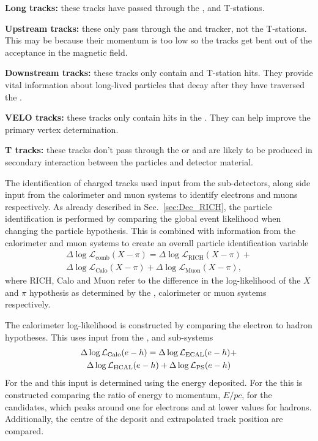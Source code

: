 \begin{description}
\item \textbf{Long tracks:} these tracks have passed through the \velo, \ttracker and T-stations.
\item \textbf{Upstream tracks:} these only pass through the \velo and \ttracker tracker, not the T-stations. This may be because their momentum is too low so the tracks get bent out of the acceptance in the magnetic field. 
\item \textbf{Downstream tracks:} these tracks only contain \ttracker and T-station hits. They provide vital information about long-lived particles that decay after they have traversed the \velo. 
\item \textbf{VELO tracks:} these tracks only contain hits in the \velo. They can help improve the primary vertex determination. 
\item \textbf{T tracks:} these tracks don't pass through the \velo or \ttracker and are likely to be produced in secondary interaction between the particles and detector material. 
\end{description}


The identification of charged tracks used input from the \rich sub-detectors, along side input from the calorimeter and muon systems to identify electrons and muons respectively. 
As already described in Sec.~\ref{sec:Dec_RICH}, the \rich particle identification is performed by comparing the global event likelihood when changing the particle hypothesis. 
This is combined with information from the calorimeter and muon systems to create an overall particle identification variable
\begin{multline}
\Delta \log{\mathcal{L}_\text{comb}}(X-\pi) =  \Delta \log{\mathcal{L}_\text{RICH}}(X-\pi) + \\
 \Delta \log{\mathcal{L}_\text{Calo}}(X-\pi) + \Delta \log{\mathcal{L}_\text{Muon}}(X-\pi),
\end{multline}
where RICH, Calo and Muon refer to the difference in the log-likelihood of the $X$ and $\pi$ hypothesis as determined by the \rich, calorimeter or muon systems respectively. 

The calorimeter log-likelihood is constructed by comparing the electron to hadron hypotheses. This uses input from the \ecal, \hcal and \presh sub-systems
\begin{multline}
\Delta \log{\mathcal{L}_\text{Calo}}(e - h) =  \Delta \log{\mathcal{L}_\text{ECAL}}(e - h) + \\
 \Delta \log{\mathcal{L}_\text{HCAL}}(e - h) + \Delta \log{\mathcal{L}_\text{PS}}(e - h)
\end{multline}
For the \hcal and \presh this input is determined using the energy deposited. For the \ecal this is constructed comparing the ratio of energy to momentum, $E/pc$, for the candidates, which peaks around one for electrons and at lower values for hadrons. Additionally, the centre of the \ecal deposit and extrapolated track position are compared.     

